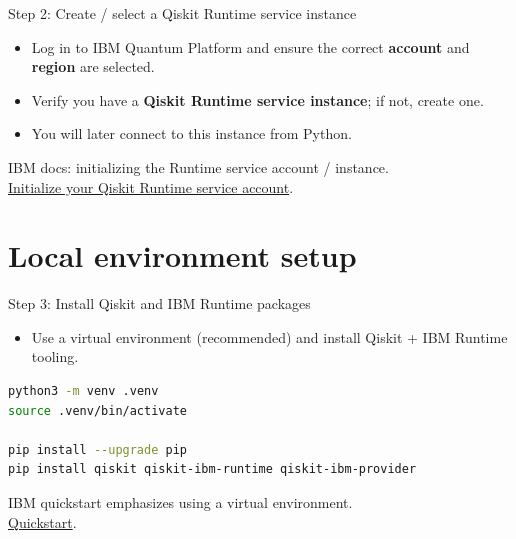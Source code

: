 \documentclass{beamer}
\begin{document}
\begin{frame}{Step 2: Create / select a Qiskit Runtime service instance}
\begin{itemize}
  \item Log in to IBM Quantum Platform and ensure the correct \textbf{account} and \textbf{region} are selected.
  \item Verify you have a \textbf{Qiskit Runtime service instance}; if not, create one.
  \item You will later connect to this instance from Python.
\end{itemize}

\vspace{0.4em}
\scriptsize
IBM docs: initializing the Runtime service account / instance.\\
\href{https://quantum.cloud.ibm.com/docs/guides/initialize-account}{Initialize your Qiskit Runtime service account}.%
\end{frame}

\section{Local environment setup}

\begin{frame}[fragile]{Step 3: Install Qiskit and IBM Runtime packages}
\begin{itemize}
  \item Use a virtual environment (recommended) and install Qiskit + IBM Runtime tooling.
\end{itemize}

\begin{lstlisting}[language=bash]
python3 -m venv .venv
source .venv/bin/activate

pip install --upgrade pip
pip install qiskit qiskit-ibm-runtime qiskit-ibm-provider
\end{lstlisting}

\vspace{0.4em}
\scriptsize
IBM quickstart emphasizes using a virtual environment.\\
\href{https://quantum.cloud.ibm.com/docs/guides/quick-start}{Quickstart}.%
\end{frame}
\end{document}
